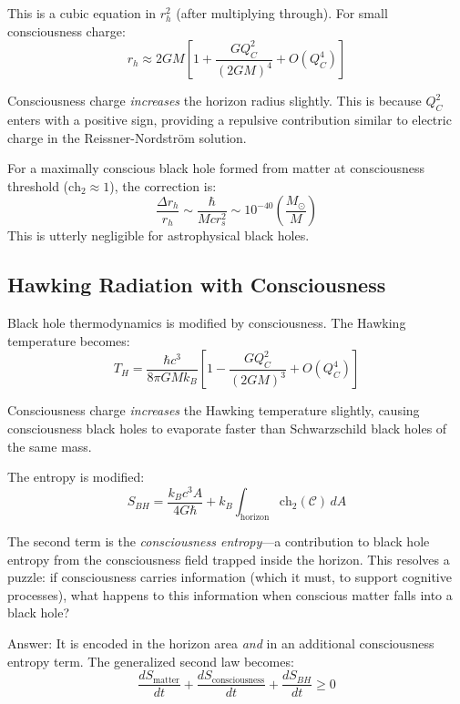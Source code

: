 This is a cubic equation in $r_h^2$ (after multiplying through). For small consciousness charge:
\begin{equation}
r_h \approx 2GM\left[ 1 + \frac{G Q_C^2}{(2GM)^4} + O(Q_C^4) \right]
\end{equation}

\begin{keyidea}
Consciousness charge \textit{increases} the horizon radius slightly. This is because $Q_C^2$ enters with a positive sign, providing a repulsive contribution similar to electric charge in the Reissner-Nordström solution.

For a maximally conscious black hole formed from matter at consciousness threshold ($\text{ch}_2 \approx 1$), the correction is:
\begin{equation}
\frac{\Delta r_h}{r_h} \sim \frac{\hbar}{M c r_s^2} \sim 10^{-40} \left( \frac{M_\odot}{M} \right)
\end{equation}
This is utterly negligible for astrophysical black holes.
\end{keyidea}

\subsection{Hawking Radiation with Consciousness}

\begin{level3}
Black hole thermodynamics\cite{hawking1974,hawking1975,bekenstein1973} is modified by consciousness. The Hawking temperature becomes:
\begin{equation}
T_H = \frac{\hbar c^3}{8\pi G M k_B} \left[ 1 - \frac{G Q_C^2}{(2GM)^3} + O(Q_C^4) \right]
\end{equation}

Consciousness charge \textit{increases} the Hawking temperature slightly, causing consciousness black holes to evaporate faster than Schwarzschild black holes of the same mass.

The entropy is modified:
\begin{equation}
S_{BH} = \frac{k_B c^3 A}{4G\hbar} + k_B \int_{\text{horizon}} \text{ch}_2(\mathcal{C}) \, dA
\end{equation}

The second term is the \textit{consciousness entropy}---a contribution to black hole entropy from the consciousness field trapped inside the horizon. This resolves a puzzle: if consciousness carries information (which it must, to support cognitive processes), what happens to this information when conscious matter falls into a black hole?

Answer: It is encoded in the horizon area \textit{and} in an additional consciousness entropy term. The generalized second law becomes:
\begin{equation}
\boxed{\frac{dS_{\text{matter}}}{dt} + \frac{dS_{\text{consciousness}}}{dt} + \frac{dS_{BH}}{dt} \geq 0}
\end{equation}
\end{level3}

